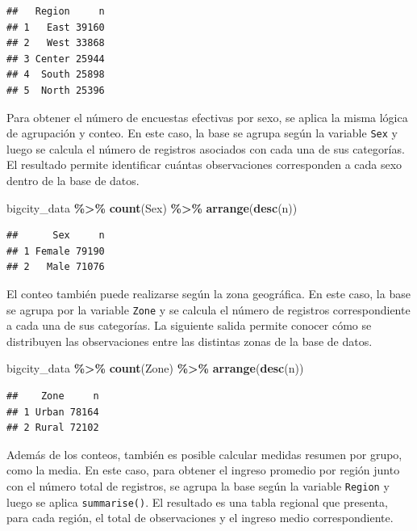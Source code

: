 \documentclass[
  spanish,
  12pt,
]{book}
\newenvironment{Shaded}{\begin{snugshade}}{\end{snugshade}}
\newcommand{\FunctionTok}[1]{\textcolor[rgb]{0.13,0.29,0.53}{\textbf{#1}}}
\newcommand{\NormalTok}[1]{#1}
\newcommand{\SpecialCharTok}[1]{\textcolor[rgb]{0.81,0.36,0.00}{\textbf{#1}}}
\begin{document}
\begin{verbatim}
##   Region     n
## 1   East 39160
## 2   West 33868
## 3 Center 25944
## 4  South 25898
## 5  North 25396
\end{verbatim}

Para obtener el número de encuestas efectivas por sexo, se aplica la misma lógica de agrupación y conteo. En este caso, la base se agrupa según la variable \texttt{Sex} y luego se calcula el número de registros asociados con cada una de sus categorías. El resultado permite identificar cuántas observaciones corresponden a cada sexo dentro de la base de datos.

\begin{Shaded}
\begin{Highlighting}[]
\NormalTok{bigcity\_data }\SpecialCharTok{\%\textgreater{}\%}
  \FunctionTok{count}\NormalTok{(Sex) }\SpecialCharTok{\%\textgreater{}\%}
  \FunctionTok{arrange}\NormalTok{(}\FunctionTok{desc}\NormalTok{(n))}
\end{Highlighting}
\end{Shaded}

\begin{verbatim}
##      Sex     n
## 1 Female 79190
## 2   Male 71076
\end{verbatim}

El conteo también puede realizarse según la zona geográfica. En este caso, la base se agrupa por la variable \texttt{Zone} y se calcula el número de registros correspondiente a cada una de sus categorías. La siguiente salida permite conocer cómo se distribuyen las observaciones entre las distintas zonas de la base de datos.

\begin{Shaded}
\begin{Highlighting}[]
\NormalTok{bigcity\_data }\SpecialCharTok{\%\textgreater{}\%}
  \FunctionTok{count}\NormalTok{(Zone) }\SpecialCharTok{\%\textgreater{}\%}
  \FunctionTok{arrange}\NormalTok{(}\FunctionTok{desc}\NormalTok{(n))}
\end{Highlighting}
\end{Shaded}

\begin{verbatim}
##    Zone     n
## 1 Urban 78164
## 2 Rural 72102
\end{verbatim}

Además de los conteos, también es posible calcular medidas resumen por grupo, como la media. En este caso, para obtener el ingreso promedio por región junto con el número total de registros, se agrupa la base según la variable \texttt{Region} y luego se aplica \texttt{summarise()}. El resultado es una tabla regional que presenta, para cada región, el total de observaciones y el ingreso medio correspondiente.
\end{document}
